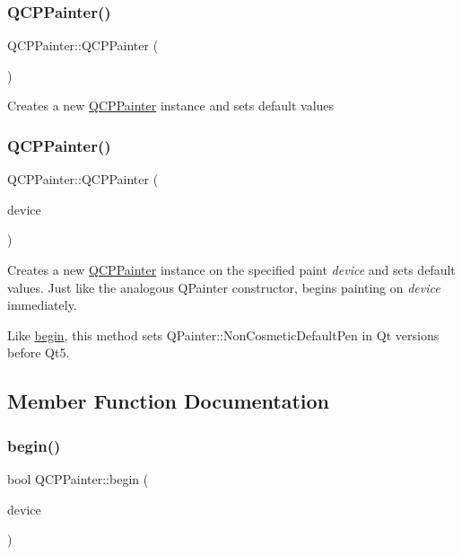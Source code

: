 \subsubsection{\texorpdfstring{Q\+C\+P\+Painter()}{QCPPainter()}\hspace{0.1cm}{\footnotesize\ttfamily [1/2]}}
{\footnotesize\ttfamily Q\+C\+P\+Painter\+::\+Q\+C\+P\+Painter (\begin{DoxyParamCaption}{ }\end{DoxyParamCaption})}

Creates a new \hyperlink{class_q_c_p_painter}{Q\+C\+P\+Painter} instance and sets default values \mbox{\label{class_q_c_p_painter_ae58dbb1795ddc4351ab324dc9898aa22}} 
\subsubsection{\texorpdfstring{Q\+C\+P\+Painter()}{QCPPainter()}\hspace{0.1cm}{\footnotesize\ttfamily [2/2]}}
{\footnotesize\ttfamily Q\+C\+P\+Painter\+::\+Q\+C\+P\+Painter (\begin{DoxyParamCaption}\item[{Q\+Paint\+Device $\ast$}]{device }\end{DoxyParamCaption})\hspace{0.3cm}{\ttfamily [explicit]}}

Creates a new \hyperlink{class_q_c_p_painter}{Q\+C\+P\+Painter} instance on the specified paint {\itshape device} and sets default values. Just like the analogous Q\+Painter constructor, begins painting on {\itshape device} immediately.

Like \hyperlink{class_q_c_p_painter_a0a41146ccd619dceab6e25ec7b46b044}{begin}, this method sets Q\+Painter\+::\+Non\+Cosmetic\+Default\+Pen in Qt versions before Qt5. 

\subsection{Member Function Documentation}
\mbox{\label{class_q_c_p_painter_a0a41146ccd619dceab6e25ec7b46b044}} 
\subsubsection{\texorpdfstring{begin()}{begin()}}
{\footnotesize\ttfamily bool Q\+C\+P\+Painter\+::begin (\begin{DoxyParamCaption}\item[{Q\+Paint\+Device $\ast$}]{device }\end{DoxyParamCaption})}

